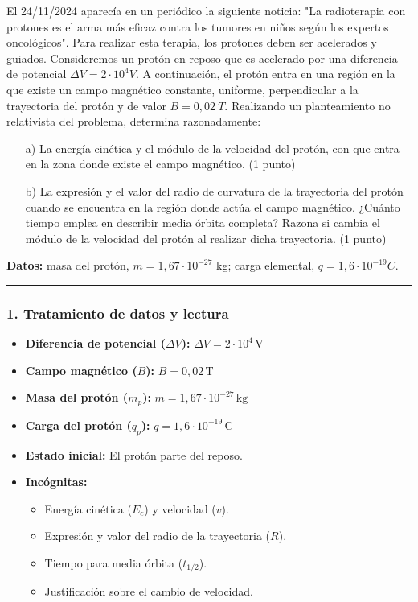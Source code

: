 \begin{cajaenunciado}
El 24/11/2024 aparecía en un periódico la siguiente noticia: "La radioterapia con protones es el arma más eficaz contra los tumores en niños según los expertos oncológicos". Para realizar esta terapia, los protones deben ser acelerados y guiados. Consideremos un protón en reposo que es acelerado por una diferencia de potencial $\Delta V=2\cdot10^{4}V$. A continuación, el protón entra en una región en la que existe un campo magnético constante, uniforme, perpendicular a la trayectoria del protón y de valor $B=0,02~T$. Realizando un planteamiento no relativista del problema, determina razonadamente:
\begin{enumerate}
    \item[a)] La energía cinética y el módulo de la velocidad del protón, con que entra en la zona donde existe el campo magnético. (1 punto)
    \item[b)] La expresión y el valor del radio de curvatura de la trayectoria del protón cuando se encuentra en la región donde actúa el campo magnético. ¿Cuánto tiempo emplea en describir media órbita completa? Razona si cambia el módulo de la velocidad del protón al realizar dicha trayectoria. (1 punto)
\end{enumerate}
\textbf{Datos:} masa del protón, $m=1,67\cdot10^{-27}$ kg; carga elemental, $q=1,6\cdot10^{-19}C$.
\end{cajaenunciado}
\hrule

\subsubsection*{1. Tratamiento de datos y lectura}
\begin{itemize}
    \item \textbf{Diferencia de potencial ($\Delta V$):} $\Delta V = 2 \cdot 10^4 \, \text{V}$
    \item \textbf{Campo magnético ($B$):} $B = 0,02 \, \text{T}$
    \item \textbf{Masa del protón ($m_p$):} $m = 1,67 \cdot 10^{-27} \, \text{kg}$
    \item \textbf{Carga del protón ($q_p$):} $q = 1,6 \cdot 10^{-19} \, \text{C}$
    \item \textbf{Estado inicial:} El protón parte del reposo.
    \item \textbf{Incógnitas:}
    \begin{itemize}
        \item Energía cinética ($E_c$) y velocidad ($v$).
        \item Expresión y valor del radio de la trayectoria ($R$).
        \item Tiempo para media órbita ($t_{1/2}$).
        \item Justificación sobre el cambio de velocidad.
    \end{itemize}
\end{itemize}

